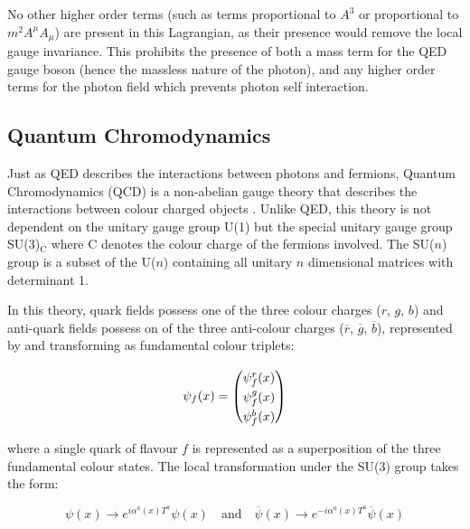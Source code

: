 \documentclass[12pt,a4paper,epsf,portrait,times,epsfig]{report}
\begin{document}
	No other higher order terms (such as terms proportional to $A^{3}$ or proportional to $m^{2}A^{\mu}A_{\mu}$) are present in this Lagrangian, as their presence would remove the local gauge invariance. This prohibits the presence of both a mass term for the QED gauge boson (hence the massless nature of the photon), and any higher order terms for the photon field which prevents photon self interaction. 

	\subsection{Quantum Chromodynamics} \label{Section:QCD}

	Just as QED describes the interactions between photons and fermions, Quantum Chromodynamics (QCD) is a non-abelian gauge theory that describes the interactions between colour charged objects \cite{Article:QCDPrimer}. Unlike QED, this theory is not dependent on the unitary gauge group U(1) but the special unitary gauge group SU(3)$_{\mathrm{C}}$ where C denotes the colour charge of the fermions involved. The SU($n$) group is a subset of the U($n$) containing all unitary $n$ dimensional matrices with determinant 1. \par

	In this theory, quark fields possess one of the three colour charges ($r$, $g$, $b$) and anti-quark fields possess on of the three anti-colour charges ($\overline{r}$, $\overline{g}$, $\overline{b}$), represented by and transforming as fundamental colour triplets:
	
	\begin{equation}
		\psi_{f}(x) = \begin{pmatrix}
			\psi_{f}^{r}(x) \rule{0pt}{2.6ex}\rule[-0.9ex]{0pt}{0pt}\\
			\psi_{f}^{g}(x) \rule{0pt}{2.6ex}\rule[-0.9ex]{0pt}{0pt}\\
			\psi_{f}^{b}(x) \rule{0pt}{2.6ex}\rule[-0.9ex]{0pt}{0pt}\\
		\end{pmatrix}
	\end{equation}	
	
	where a single quark of flavour $f$ is represented as a superposition of the three fundamental colour states. The local transformation under the SU(3) group takes the form:
	
	\begin{equation}
		\psi(x) \rightarrow e^{i\alpha^{a}(x)T^{a}}\psi(x)
		\quad \mathrm{and} \quad
		\overline{\psi}(x) \rightarrow e^{-i\alpha^{a}(x)T^{a}}\overline{\psi}(x)
	\end{equation}
\end{document}
